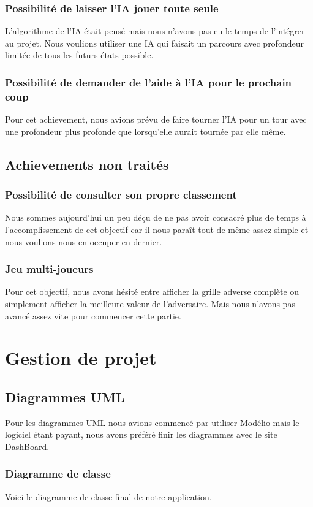 \documentclass[a4paper,10pt]{report}
\begin{document}
   \section{Possibilité de laisser l'IA jouer toute seule}
     L'algorithme de l'IA était pensé mais nous n'avons pas eu le temps de l'intégrer au projet. Nous voulions utiliser une IA qui faisait un parcours avec profondeur limitée de tous les futurs états possible.
   \section{Possibilité de demander de l'aide à l'IA pour le prochain coup}
     Pour cet achievement, nous avions prévu de faire tourner l'IA pour un tour avec une profondeur plus profonde que lorsqu'elle aurait tournée par elle même.
 \chapter{Achievements non traités}
   \section{Possibilité de consulter son propre classement}
     Nous sommes aujourd'hui un peu déçu de ne pas avoir consacré plus de temps à l'accomplissement de cet objectif car il nous paraît tout de même assez simple et nous voulions nous en occuper en dernier.
   \section{Jeu multi-joueurs}
     Pour cet objectif, nous avons hésité entre afficher la grille adverse complète ou simplement afficher la meilleure valeur de l'adversaire. Mais nous n'avons pas avancé assez vite pour
     commencer cette partie.
\part{Gestion de projet}
 \chapter{Diagrammes UML}
   Pour les diagrammes UML nous avions commencé par utiliser Modélio mais le logiciel étant payant, nous avons préféré finir les diagrammes avec le site DashBoard.
   \section{Diagramme de classe}
     Voici le diagramme de classe final de notre application.
\end{document}
